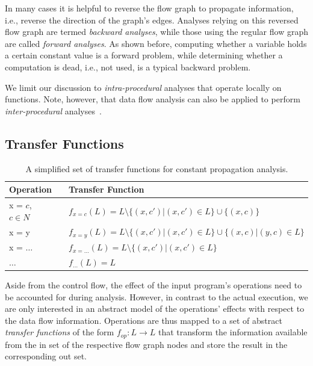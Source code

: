 In many cases it is helpful to reverse the flow graph to propagate information,
i.e., reverse the direction of the graph's edges. Analyses relying on this
reversed flow graph are termed \emph{backward analyses}, while those using the
regular flow graph are called \emph{forward analyses}. As shown before,
computing whether a variable holds a certain constant value is a forward
problem, while determining whether a computation is dead, i.e., not used, is a
typical backward problem.

We limit our discussion to \emph{intra-procedural} analyses that operate locally
on functions. Note, however, that data flow analysis can also be applied to
perform \emph{inter-procedural} analyses~\cite{novillo:bib:NNH99}.

\subsection{Transfer Functions}

\begin{table}[t]
  \begin{center}
    \begin{tabular}{lp{8mm}l}
      Operation          & & Transfer Function                      \\ \hline
      x = $c$, $c \in N$ & & $f_{x=c}(L) = L \setminus \{ (x, c') | (x, c') \in L \} \cup \{ (x, c) \}$ \\
      x = y              & & $f_{x=y}(L) = L \setminus \{ (x, c') | (x, c') \in L \} \cup \{ (x, c) | (y,c) \in L\}$ \\
      x = $\ldots$       & & $f_{x=\ldots}(L) = L \setminus \{ (x, c') | (x, c') \in L \}$ \\
      $\ldots$           & & $f_{\ldots}(L) = L$ \\ \hline
    \end{tabular}
  \end{center}
  \caption{A simplified set of transfer functions for constant propagation
           analysis.}
  \label{novillo:fig:transfer_functions}
\end{table}

Aside from the control flow, the effect of the input program's operations
need to be accounted for during analysis. However, in contrast to the actual
execution, we are only interested in an abstract model of the operations'
effects with respect to the data flow information. Operations are thus mapped to
a set of abstract \emph{transfer functions} of the form $f_{op}: L \rightarrow
L$ that transform the information available from the in set of the respective
flow graph nodes and store the result in the corresponding out set.

